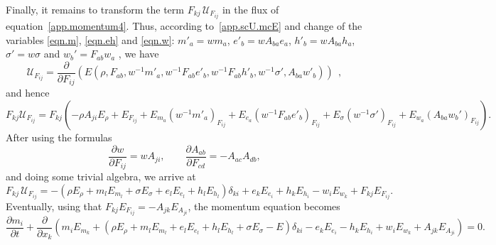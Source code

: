 \documentclass[twoside]{article}
\newcommand{\scU}{{\mathscr{U}}}
\newcommand{\ted}{E} %
\newcommand{\pd}{\partial}
\begin{document}
Finally, it remains to transform the term $  
F_{kj}\,\scU_{F_{ij}} $ in the flux of 
equation~\eqref{app.momentum4}. Thus, according to~\eqref{app.scU.mcE} and 
change of the variables \eqref{eqn.m}, \eqref{eqn.eh} and \eqref{eqn.w}: $ m'_a 
= w m_a $, $e'_b = w A_{{ba}}e_a $, $h'_b = w A_{{ba}}h_a$, $\sigma' = w \sigma 
$ and $ w_b' = F_{ab}w_a $ , we have
\begin{equation}
\scU_{F_{ij}} = \frac{\pd}{\pd F_{ij}}\left( \ted(\rho,F_{ab},w^{-1} m'_a, 
w^{-1}F_{ab}e'_b, 
w^{-1}F_{ab}h'_b,
w^{-1}\sigma',A_{ba} w'_b) \right)\ \ ,
\end{equation}
and hence
\begin{equation}
F_{kj}\scU_{F_{ij}}=F_{kj}\left(-\rho  
A_{ji}\ted_{\rho 
}+\ted_{F_{ij}}+\ted_{m_a}(w^{-1}m'_a)_{F_{ij}} + 
\ted_{e_a}(w^{-1}F_{ab}e'_b 
)_{F_{ij}} + \ted_{\sigma }(w^{-1}\sigma' )_{F_{ij}} + 
\ted_{w_a}\left(A_{ba}w_b'\right)_{F_{ij}}\right).
\end{equation}
After using the formulas 
\begin{equation}
\frac{\pd w}{\pd F_{ij}} = w A_{ji},\qquad \frac{\pd A_{ab}}{\pd F_{cd}} = 
-A_{ac}A_{db}, 
\end{equation}
and doing some trivial algebra, we arrive at
\begin{equation}\label{eqn.momentum.stress}
 F_{kj}\,\scU_{F_{ij}} = -(\rho\ted_\rho + m_l\ted_{m_l} + \sigma\ted_\sigma + 
 e_l\ted_{e_l} + 
 h_l\ted_{h_l})\delta_{ki} + e_k\ted_{e_i} + h_k\ted_{h_i} - w_i\ted_{w_k} + 
 F_{kj}\ted_{F_{ij}}.
\end{equation}
Eventually, using that $ F_{kj}\ted_{F_{ij}} =-A_{jk}\ted_{A_{ji}} $, the 
momentum equation becomes
\begin{equation}\label{app.momentum5}
\frac{\pd m_i}{\pd t}  + \frac{\pd }{\pd 
x_k}\left(m_i \ted_{m_k} + (\rho\ted_\rho + m_l\ted_{m_l} + 
e_l\ted_{e_l} + 
 h_l\ted_{h_l} + \sigma\ted_\sigma - \ted)\delta_{ki} - e_k\ted_{e_i} - 
 h_k\ted_{h_i} + 
 w_i\ted_{w_k} + 
 A_{jk}\ted_{A_{ji}}\right) =0.
\end{equation}
\end{document}
